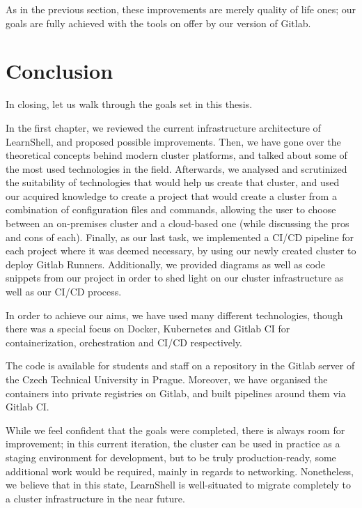\documentclass[thesis=B,english]{FITthesis}[2019/12/23]
\begin{document}
As in the previous section, these improvements are merely quality of life ones; our goals are fully achieved with the tools on offer by our version of Gitlab.

\chapter{Conclusion}

In closing, let us walk through the goals set in this thesis. 

In the first chapter, we reviewed the current infrastructure architecture of LearnShell, and proposed possible improvements. Then, we have gone over the theoretical concepts behind modern cluster platforms, and talked about some of the most used technologies in the field. Afterwards, we analysed and scrutinized the suitability of technologies that would help us create that cluster, and used our acquired knowledge to create a project that would create a cluster from a combination of configuration files and commands, allowing the user to choose between an on-premises cluster and a cloud-based one (while discussing the pros and cons of each). Finally, as our last task, we implemented a CI/CD pipeline for each project where it was deemed necessary, by using our newly created cluster to deploy Gitlab Runners. Additionally, we provided diagrams as well as code snippets from our project in order to shed light on our cluster infrastructure as well as our CI/CD process. 

In order to achieve our aims, we have used many different technologies, though there was a special focus on Docker, Kubernetes and Gitlab CI for containerization, orchestration and CI/CD respectively.

The code is available for students and staff on a repository in the Gitlab server of the Czech Technical University in Prague. Moreover, we have organised the containers into private registries on Gitlab, and built pipelines around them via Gitlab CI.

While we feel confident that the goals were completed, there is always room for improvement; in this current iteration, the cluster can be used in practice as a staging environment for development, but to be truly production-ready, some additional work would be required, mainly in regards to networking. Nonetheless, we believe that in this state, LearnShell is well-situated to migrate completely to a cluster infrastructure in the near future.
\end{document}
